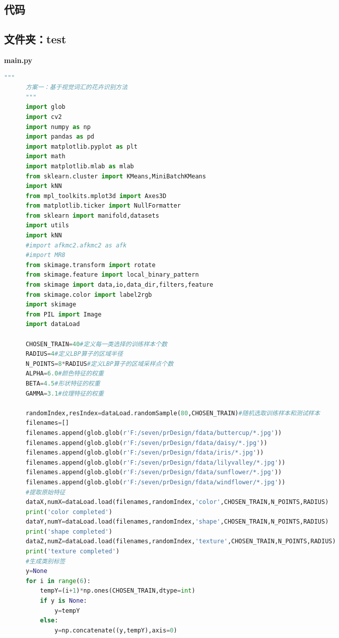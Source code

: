 \documentclass[supercite]{HustGraduPaper}
\begin{document}
\begin{sloppypar}
\begin{appendices}
	  \section{代码}
    \subsection{文件夹：test}
    \textbf{main.py}
    \begin{spacing}{1.25}
		\begin{lstlisting}[language=python]
      """
      方案一：基于视觉词汇的花卉识别方法
      """
      import glob
      import cv2
      import numpy as np
      import pandas as pd
      import matplotlib.pyplot as plt
      import math
      import matplotlib.mlab as mlab
      from sklearn.cluster import KMeans,MiniBatchKMeans
      import kNN
      from mpl_toolkits.mplot3d import Axes3D
      from matplotlib.ticker import NullFormatter
      from sklearn import manifold,datasets
      import utils
      import kNN
      #import afkmc2.afkmc2 as afk
      #import MR8
      from skimage.transform import rotate
      from skimage.feature import local_binary_pattern
      from skimage import data,io,data_dir,filters,feature
      from skimage.color import label2rgb
      import skimage
      from PIL import Image
      import dataLoad
      
      CHOSEN_TRAIN=40#定义每一类选择的训练样本个数
      RADIUS=4#定义LBP算子的区域半径
      N_POINTS=8*RADIUS#定义LBP算子的区域采样点个数
      ALPHA=6.0#颜色特征的权重
      BETA=4.5#形状特征的权重
      GAMMA=3.1#纹理特征的权重
      
      randomIndex,resIndex=dataLoad.randomSample(80,CHOSEN_TRAIN)#随机选取训练样本和测试样本
      filenames=[]
      filenames.append(glob.glob(r'F:/seven/prDesign/fdata/buttercup/*.jpg'))
      filenames.append(glob.glob(r'F:/seven/prDesign/fdata/daisy/*.jpg'))
      filenames.append(glob.glob(r'F:/seven/prDesign/fdata/iris/*.jpg'))
      filenames.append(glob.glob(r'F:/seven/prDesign/fdata/lilyvalley/*.jpg'))
      filenames.append(glob.glob(r'F:/seven/prDesign/fdata/sunflower/*.jpg'))
      filenames.append(glob.glob(r'F:/seven/prDesign/fdata/windflower/*.jpg'))
      #提取原始特征
      dataX,numX=dataLoad.load(filenames,randomIndex,'color',CHOSEN_TRAIN,N_POINTS,RADIUS)
      print('color completed')
      dataY,numY=dataLoad.load(filenames,randomIndex,'shape',CHOSEN_TRAIN,N_POINTS,RADIUS)
      print('shape completed')
      dataZ,numZ=dataLoad.load(filenames,randomIndex,'texture',CHOSEN_TRAIN,N_POINTS,RADIUS)
      print('texture completed')
      #生成类别标签
      y=None
      for i in range(6):
          tempY=(i+1)*np.ones(CHOSEN_TRAIN,dtype=int)
          if y is None:
              y=tempY
          else:
              y=np.concatenate((y,tempY),axis=0)
      

\end{lstlisting}
\end{spacing}
\end{appendices}
\end{sloppypar}
\end{document}
